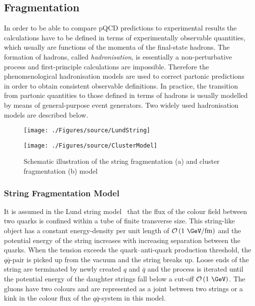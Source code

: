 \subsection{Fragmentation}
\label{subsec:fragmentation}
In order to be able to compare pQCD predictions to experimental results the calculations have to be defined in terms of experimentally observable quantities, which usually are functions of the momenta of the final-state hadrons. The formation of hadrons, called \emph{hadronisation}, is essentially a non-perturbative process and first-principle calculations are impossible. Therefore the phenomenological hadronisation models are used to correct partonic predictions in order to obtain consistent observable definitions. In practice, the transition from partonic quantities to those defined in terms of hadrons is usually modelled by means of general-purpose event generators. Two widely used hadronisation models are described below.
\begin{figure}[t]
	\centering
	\begin{subfloat}[]{
		\texttt{[image: ./Figures/source/LundString]}
		\label{fig:lund}
	 }%
	\end{subfloat}
	\begin{subfloat}[]{
		\texttt{[image: ./Figures/source/ClusterModel]}
		\label{fig:cluster}
	}%
	\end{subfloat}
	\caption{Schematic illustration of the string fragmentation (a) and cluster fragmentation (b) model}
\label{fig:fragmentationmodels}
\end{figure}
\subsubsection{String Fragmentation Model}
It is assumed in the Lund string model~\cite{Andersson:1983ia} that the flux of the colour field between two quarks is confined within a tube of finite transverse size. This string-like object has a constant energy-density per unit length of $\mathcal{O}\left( \text{1 \GeV/fm}\right)$ and the potential energy of the string increases with increasing separation between the quarks. When the tension exceeds the quark--anti-quark production threshold, the $q\bar{q}$-pair is picked up from the vacuum and the string breaks up. Loose ends of the string are terminated by newly created $q$ and $\bar{q}$ and the process is iterated until the potential energy of the daughter strings fall below a cut-off $\mathcal{O}\left( \text{1 \GeV}\right)$. The gluons have two colours and are represented as a joint between two strings or a kink in the colour flux of the $q\bar{q}$-system in this model. 

